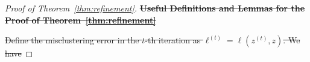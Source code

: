 \documentclass[lettersize,onecolumn,journal]{IEEEtran}
\theoremstyle{definition}
\newtheorem{lem}{Lemma}
\theoremstyle{definition}
\newcommand{\of}[1]{\left(#1\right)}
\newcommand{\offf}[1]{\left\{#1\right\}}
\providecommand{\DIFaddtex}[1]{{\protect\color{blue}\uwave{#1}}} %
\providecommand{\DIFdeltex}[1]{{\protect\color{red}\sout{#1}}}                      %
\providecommand{\DIFaddbegin}{} %
\providecommand{\DIFaddend}{} %
\providecommand{\DIFdelbegin}{} %
\providecommand{\DIFdelend}{} %
\providecommand{\DIFadd}[1]{\texorpdfstring{\DIFaddtex{#1}}{#1}} %
\providecommand{\DIFdel}[1]{\texorpdfstring{\DIFdeltex{#1}}{}} %
\newcommand{\DIFscaledelfig}{0.5}
\newlength{\DIFdelgraphicswidth} %
\newlength{\DIFdelgraphicsheight} %
\newcommand{\DIFaddincludegraphics}[2][]{{\color{blue}\fbox{\DIFOincludegraphics[#1]{#2}}}} %
\newcommand{\DIFdelincludegraphics}[2][]{%
\sbox{\DIFdelgraphicsbox}{\DIFOincludegraphics[#1]{#2}}%
\settoboxwidth{\DIFdelgraphicswidth}{\DIFdelgraphicsbox} %
\settoboxtotalheight{\DIFdelgraphicsheight}{\DIFdelgraphicsbox} %
\scalebox{\DIFscaledelfig}{%
\parbox[b]{\DIFdelgraphicswidth}{\usebox{\DIFdelgraphicsbox}\\[-\baselineskip] \rule{\DIFdelgraphicswidth}{0em}}\llap{\resizebox{\DIFdelgraphicswidth}{\DIFdelgraphicsheight}{%
\setlength{\unitlength}{\DIFdelgraphicswidth}%
\begin{picture}(1,1)%
\thicklines\linethickness{2pt} %
{\color[rgb]{1,0,0}\put(0,0){\framebox(1,1){}}}%
{\color[rgb]{1,0,0}\put(0,0){\line( 1,1){1}}}%
{\color[rgb]{1,0,0}\put(0,1){\line(1,-1){1}}}%
\end{picture}%
}\hspace*{3pt}}} %
} %
\DeclareRobustCommand{\DIFaddbegin}{\DIFOaddbegin \let\includegraphics\DIFaddincludegraphics} %
\DeclareRobustCommand{\DIFaddend}{\DIFOaddend \let\includegraphics\DIFOincludegraphics} %
\DeclareRobustCommand{\DIFdelbegin}{\DIFOdelbegin \let\includegraphics\DIFdelincludegraphics} %
\DeclareRobustCommand{\DIFdelend}{\DIFOaddend \let\includegraphics\DIFOincludegraphics} %
\begin{document}
\begin{proof}[Proof of Theorem~\ref{thm:refinement}]


\DIFdelend \DIFaddbegin \DIFadd{$ if $}\ma \DIFadd{= }\DIFaddend {\bf \DIFdelbegin \DIFdel{Useful Definitions and Lemmas for the Proof of Theorem~\ref{thm:refinement}}\DIFdelend \DIFaddbegin \DIFadd{0}\DIFaddend }\DIFdelbegin %

\DIFdel{Define the misclustering error in the $t$-th iteration as $\ell^{(t)} = \ell(z^{(t)}, z)$. We have 
}%


\end{proof}
\end{document}
